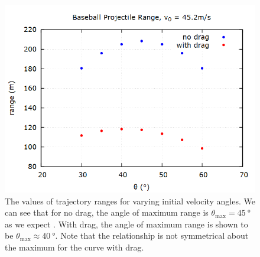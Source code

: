 \documentclass[aps,prl,twocolumn,superscriptaddress]{revtex4-1}
\begin{document}
\begin{figure}[htbp]
  	\begin{center}
 		\includegraphics[scale=0.3]{avr.png}
  		\caption{The values of trajectory ranges for varying initial velocity angles. We can see that for no drag, the angle of maximum range is $\theta_{\text{max}} = \SI{45}{\degree}$ as we expect \cite{ang}. With drag, the angle of maximum range is shown to be $\theta_{\text{max}} \approx \SI{40}{\degree}$. Note that the relationship is not symmetrical about the maximum for the curve with drag.}
  		\label{gr:avr}
 	\end{center}
\end{figure}
\end{document}
